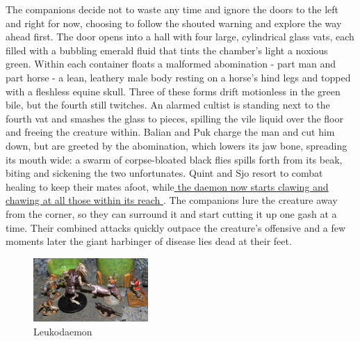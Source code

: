 The companions decide not to waste any time and ignore the doors to the left and right for now, choosing to follow the shouted warning and explore the way ahead first. The door opens into a hall with four large, cylindrical glass vats, each filled with a bubbling emerald fluid that tints the chamber's light a noxious green. Within each container floats a malformed abomination - part man and part horse - a lean, leathery male body resting on a horse's hind legs and topped with a fleshless equine skull. Three of these forms drift motionless in the green bile, but the fourth still twitches. An alarmed cultist is standing next to the fourth vat and smashes the glass to pieces, spilling the vile liquid over the floor and freeing the creature within. Balian and Puk charge the man and cut him down, but are greeted by the abomination, which lowers its jaw bone, spreading its mouth wide: a swarm of corpse-bloated black flies spills forth from its beak, biting and sickening the two unfortunates. Quint and Sjo resort to combat healing to keep their mates afoot, while\hyperref[fig:Leukodaemon-523050841]{ the daemon now starts clawing and chawing at all those within its reach } . The companions lure the creature away from the corner, so they can surround it and start cutting it up one gash at a time. Their combined attacks quickly outpace the creature's offensive and a few moments later the giant harbinger of disease lies dead at their feet. \\

\begin{figure}[h]
	\centering
	\includegraphics[width=0.39\textwidth]{images/Leukodaemon-523050841.jpg}
	\caption{Leukodaemon}
	\label{fig:Leukodaemon-523050841}
\end{figure}

